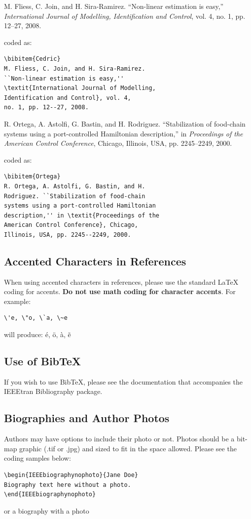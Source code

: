 \documentclass[lettersize,journal]{IEEEtran}
\begin{document}
\noindent [8] M. Fliess, C. Join, and H. Sira-Ramirez. ``Non-linear estimation is easy,'' \textit{International Journal of Modelling, Identification and Control}, vol. 4, no. 1, pp. 12--27, 2008.

\noindent coded as:
\begin{verbatim}
\bibitem{Cedric}
M. Fliess, C. Join, and H. Sira-Ramirez. 
``Non-linear estimation is easy,'' 
\textit{International Journal of Modelling, 
Identification and Control}, vol. 4, 
no. 1, pp. 12--27, 2008.
\end{verbatim}

\noindent [9] R. Ortega, A. Astolfi, G. Bastin, and H. Rodriguez. ``Stabilization of food-chain systems using a port-controlled Hamiltonian description,'' in \textit{Proceedings of the American Control Conference}, Chicago, Illinois, USA, pp. 2245--2249, 2000.

\noindent coded as:
\begin{verbatim}
\bibitem{Ortega}
R. Ortega, A. Astolfi, G. Bastin, and H. 
Rodriguez. ``Stabilization of food-chain 
systems using a port-controlled Hamiltonian 
description,'' in \textit{Proceedings of the 
American Control Conference}, Chicago, 
Illinois, USA, pp. 2245--2249, 2000.
\end{verbatim}

\subsection{Accented Characters in References}
\noindent When using accented characters in references, please use the standard LaTeX coding for accents. {\bf{Do not use math coding for character accents}}. For example:
\begin{verbatim}
\'e, \"o, \`a, \~e 
\end{verbatim}
will produce: \'e, \"o, \`a, \~e


\subsection{Use of BibTeX}
\noindent If you wish to use BibTeX, please see the documentation that accompanies the IEEEtran Bibliography package.

\subsection{Biographies and Author Photos}
\noindent Authors may have options to include their photo or not. Photos should be a bit-map graphic (.tif or .jpg) and sized to fit in the space allowed. Please see the coding samples below:
\begin{verbatim}
\begin{IEEEbiographynophoto}{Jane Doe}
Biography text here without a photo.
\end{IEEEbiographynophoto}
\end{verbatim}
or a biography with a photo
\end{document}
